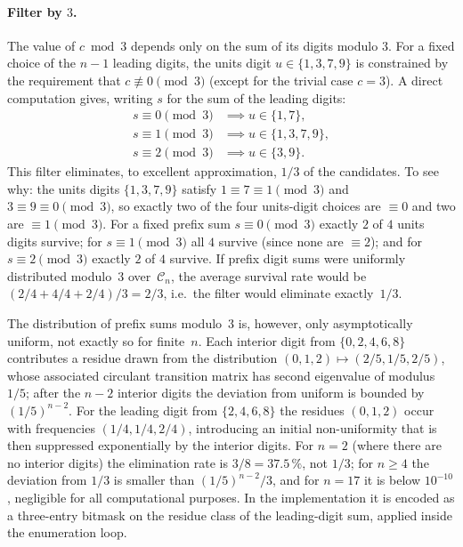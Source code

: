 \documentclass[11pt,a4paper]{article}
\theoremstyle{definition}
\begin{document}
\paragraph{Filter by $3$.} The value of $c \bmod 3$ depends only on the sum
of its digits modulo $3$. For a fixed choice of the $n-1$ leading digits, the
units digit $u \in \{1,3,7,9\}$ is constrained by the requirement that
$c \not\equiv 0 \pmod 3$ (except for the trivial case $c = 3$). A direct
computation gives, writing $s$ for the sum of the leading digits:
\begin{align*}
  s \equiv 0 \pmod 3 &\implies u \in \{1, 7\},\\
  s \equiv 1 \pmod 3 &\implies u \in \{1, 3, 7, 9\},\\
  s \equiv 2 \pmod 3 &\implies u \in \{3, 9\}.
\end{align*}
This filter eliminates, to excellent approximation, $1/3$ of the candidates.
To see why: the units digits $\{1,3,7,9\}$ satisfy $1\equiv 7\equiv 1\pmod 3$
and $3\equiv 9\equiv 0\pmod 3$, so exactly two of the four units-digit choices
are $\equiv 0$ and two are $\equiv 1\pmod 3$. For a fixed prefix sum
$s\equiv 0\pmod 3$ exactly $2$ of $4$ units digits survive; for
$s\equiv 1\pmod 3$ all $4$ survive (since none are $\equiv 2$); and for
$s\equiv 2\pmod 3$ exactly $2$ of $4$ survive. If prefix digit sums were
uniformly distributed modulo~$3$ over~$\mathcal{C}_n$, the average survival
rate would be $(2/4 + 4/4 + 2/4)/3 = 2/3$, i.e.\ the filter would eliminate
exactly~$1/3$.

The distribution of prefix sums modulo~$3$ is, however, only asymptotically
uniform, not exactly so for finite~$n$. Each interior digit from
$\{0,2,4,6,8\}$ contributes a residue drawn from the distribution
$(0,1,2) \mapsto (2/5,1/5,2/5)$, whose associated circulant transition
matrix has second eigenvalue of modulus~$1/5$; after the $n-2$ interior
digits the deviation from uniform is bounded by~$(1/5)^{n-2}$. For the
leading digit from $\{2,4,6,8\}$ the residues $(0,1,2)$ occur with
frequencies $(1/4,1/4,2/4)$, introducing an initial non-uniformity that is
then suppressed exponentially by the interior digits. For $n = 2$ (where
there are no interior digits) the elimination rate is $3/8 = 37.5\,\%$,
not $1/3$; for $n \geq 4$ the deviation from $1/3$ is smaller than
$(1/5)^{n-2}/3$, and for $n = 17$ it is below $10^{-10}$, negligible for
all computational purposes.
In the implementation it is encoded as a three-entry bitmask on the residue class of the leading-digit
sum, applied inside the enumeration loop.
\end{document}

